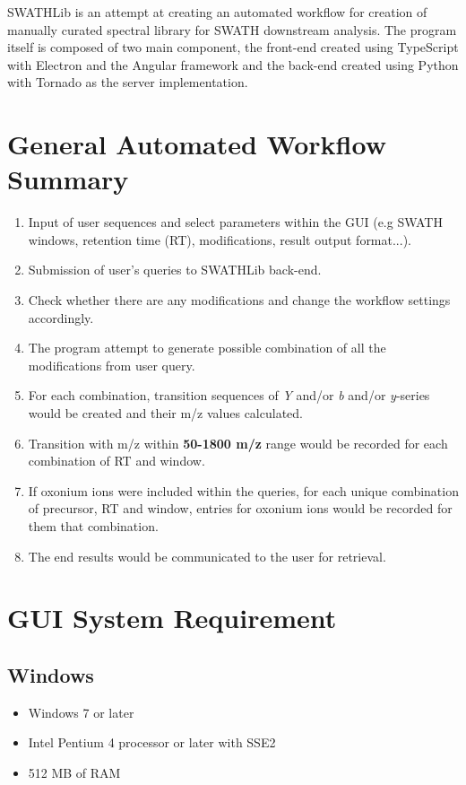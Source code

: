 \documentclass[../manual.tex]{subfiles}
\begin{document}
SWATHLib is an attempt at creating an automated workflow for creation of manually curated spectral library for SWATH downstream analysis. The program itself is composed of two main component, the front-end created using TypeScript with Electron and the Angular framework and the back-end created using Python with Tornado as the server implementation.
\section{General Automated Workflow Summary}
\begin{enumerate}
	\item Input of user sequences and select parameters within the GUI (e.g SWATH windows, retention time (RT), modifications, result output format...).
	\item Submission of user's queries to SWATHLib back-end.
	\item Check whether there are any modifications and change the workflow settings accordingly.
	\item The program attempt to generate possible combination of all the modifications from user query.
	\item For each combination, transition sequences of \emph{Y}  and/or \emph{b} and/or \emph{y}-series would be created and their m/z values calculated.
	\item Transition with m/z within \textbf{50-1800 m/z} range would be recorded for each combination of RT and window.
	\item If oxonium ions were included within the queries, for each unique combination of precursor, RT and window, entries for oxonium ions would be recorded for them that combination.
	\item The end results would be communicated to the user for retrieval.
\end{enumerate}
\section{GUI System Requirement}
\subsection{Windows}

\begin{itemize}
	\item Windows 7 or later
	\item Intel Pentium 4 processor or later with SSE2
	\item 512 MB of RAM
\end{itemize}
\end{document}
